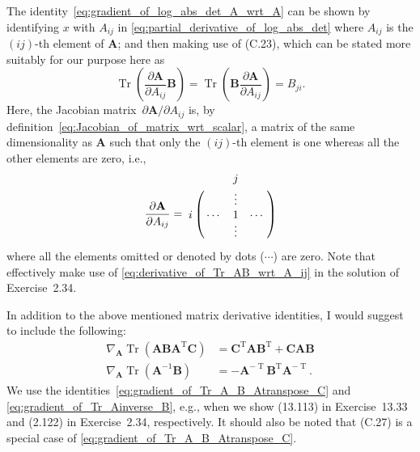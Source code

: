 \documentclass[12pt,a4paper]{article}
\begin{document}
The identity~\eqref{eq:gradient_of_log_abs_det_A_wrt_A} can be shown by
identifying $x$ with $A_{ij}$ in \eqref{eq:partial_derivative_of_log_abs_det}
where $A_{ij}$ is the $(ij)$-th element of $\mathbf{A}$; and
then making use of (C.23), which can be stated more suitably for our purpose here as
\begin{equation}
\operatorname{Tr}\left(\frac{\partial\mathbf{A}}{\partial A_{ij}}\mathbf{B}\right)
= \operatorname{Tr}\left(\mathbf{B}\frac{\partial\mathbf{A}}{\partial A_{ij}}\right)
= B_{ji} .
\label{eq:derivative_of_Tr_AB_wrt_A_ij}
\end{equation}
Here, the Jacobian matrix~$\partial\mathbf{A}/\partial A_{ij}$ is,
by definition~\eqref{eq:Jacobian_of_matrix_wrt_scalar},
a matrix of the same dimensionality as $\mathbf{A}$
such that only the $(ij)$-th element is one whereas all the other elements are zero, i.e.,
\begin{equation}
\frac{\partial\mathbf{A}}{\partial A_{ij}}
= \bordermatrix{
  &        & j      &        \cr
  &        & \vdots &        \cr
i & \cdots & 1      & \cdots \cr
  &        & \vdots &        \cr
}
\end{equation}
where all the elements omitted or denoted by dots ($\cdots$) are zero.
Note that \citet{Svensen:PRML_web_solution} effectively make use of
\eqref{eq:derivative_of_Tr_AB_wrt_A_ij} in the solution of Exercise~2.34.

In addition to the above mentioned matrix derivative identities,
I would suggest to include the following:
\begin{align}
\nabla_{\mathbf{A}} \operatorname{Tr}\left(
\mathbf{A}\mathbf{B}\mathbf{A}^{\operatorname{T}}\mathbf{C} \right) &=
\mathbf{C}^{\operatorname{T}} \mathbf{A} \mathbf{B}^{\operatorname{T}} +
\mathbf{C} \mathbf{A} \mathbf{B}
\label{eq:gradient_of_Tr_A_B_Atranspose_C} \\
\nabla_{\mathbf{A}} \operatorname{Tr}\left(\mathbf{A}^{-1}\mathbf{B}\right) &=
- \mathbf{A}^{-\operatorname{T}} \mathbf{B}^{\operatorname{T}} \mathbf{A}^{-\operatorname{T}}.
\label{eq:gradient_of_Tr_Ainverse_B}
\end{align}
We use the identities~\eqref{eq:gradient_of_Tr_A_B_Atranspose_C} and
\eqref{eq:gradient_of_Tr_Ainverse_B}, e.g.,
when we show (13.113) in Exercise~13.33 and (2.122) in Exercise~2.34, respectively.
It should also be noted that (C.27) is a special case of
\eqref{eq:gradient_of_Tr_A_B_Atranspose_C}.
\end{document}
